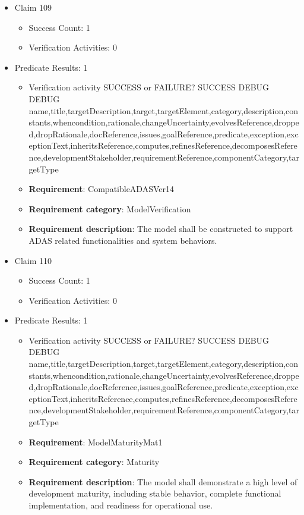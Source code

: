 \documentclass{article}
\begin{document}
\begin{itemize}
  				  \item Claim 109
				\begin{itemize}
			    	\item Success Count: 1 
			    	\item Verification Activities: 0
				\end{itemize}
				
									    
				\item Predicate Results: 1
					\begin{itemize}				
					\item Verification activity SUCCESS or FAILURE? SUCCESS
					DEBUG DEBUG name,title,targetDescription,target,targetElement,category,description,constants,whencondition,rationale,changeUncertainty,evolvesReference,dropped,dropRationale,docReference,issues,goalReference,predicate,exception,exceptionText,inheritsReference,computes,refinesReference,decomposesReference,developmentStakeholder,requirementReference,componentCategory,targetType
					\item \textbf{Requirement}: CompatibleADASVer14 
					\item \textbf{Requirement category}: ModelVerification
					\item \textbf{Requirement description}: The model shall be constructed to support ADAS related functionalities and system behaviors.
					\end{itemize}

  				  \item Claim 110
				\begin{itemize}
			    	\item Success Count: 1 
			    	\item Verification Activities: 0
				\end{itemize}
				
									    
				\item Predicate Results: 1
					\begin{itemize}				
					\item Verification activity SUCCESS or FAILURE? SUCCESS
					DEBUG DEBUG name,title,targetDescription,target,targetElement,category,description,constants,whencondition,rationale,changeUncertainty,evolvesReference,dropped,dropRationale,docReference,issues,goalReference,predicate,exception,exceptionText,inheritsReference,computes,refinesReference,decomposesReference,developmentStakeholder,requirementReference,componentCategory,targetType
					\item \textbf{Requirement}: ModelMaturityMat1 
					\item \textbf{Requirement category}: Maturity
					\item \textbf{Requirement description}: The model shall demonstrate a high level of development maturity, including stable behavior, complete functional implementation, and readiness for operational use.
					\end{itemize}


\end{itemize}
\end{document}
